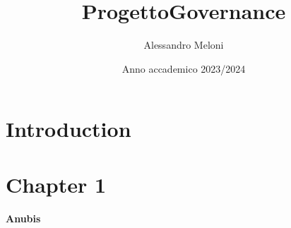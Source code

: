\documentclass{article}
\title{ProgettoGovernance}
\author{Alessandro Meloni}
\date{Anno accademico 2023/2024}
\begin{document}
\maketitle

\section{Introduction}
\section{Chapter 1}
\paragraph{Anubis}
\end{document}
